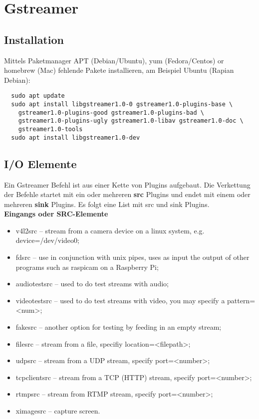 \newpage
\section{Gstreamer}

\subsection{Installation}
Mittels Paketmanager APT (Debian/Ubuntu), yum (Fedora/Centos) or homebrew (Mac) 
fehlende Pakete installieren, am Beispiel Ubuntu (Rapian Debian):
\begin{verbatim}
  sudo apt update 
  sudo apt install libgstreamer1.0-0 gstreamer1.0-plugins-base \
    gstreamer1.0-plugins-good gstreamer1.0-plugins-bad \
    gstreamer1.0-plugins-ugly gstreamer1.0-libav gstreamer1.0-doc \
    gstreamer1.0-tools
  sudo apt install libgstreamer1.0-dev
\end{verbatim}

\subsection{I/O Elemente}
Ein Gstreamer Befehl ist aus einer Kette von Plugins aufgebaut. Die Verkettung der Befehle startet mit ein oder mehreren \textbf{src} Plugins und endet mit einem oder mehreren \textbf{sink} Plugins. Es folgt eine List mit src und sink Plugins.\\

\textbf{Eingangs oder SRC-Elemente}
\begin{itemize}
\item v4l2src – stream from a camera device on a linux system, e.g. device=/dev/video0;
\item fdsrc – use in conjunction with unix pipes, uses as input the output of other programs such as raspicam on a Raspberry Pi;
\item audiotestsrc – used to do test streams with audio;
\item videotestsrc – used to do test streams with video, you may specify a pattern=<num>;
\item fakesrc – another option for testing by feeding in an empty stream;
\item filesrc – stream from a file, specifiy location=<filepath>;
\item udpsrc – stream from a UDP stream, specify port=<number>;
\item tcpclientsrc – stream from a TCP (HTTP) stream, specify port=<number>;
\item rtmpsrc – stream from RTMP stream, specify port=<number>;
\item ximagesrc – capture screen.
\end{itemize}


